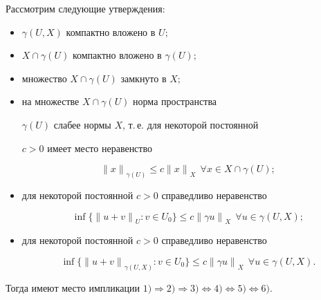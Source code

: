 \begin{thms} \label{DeniLions}


Рассмотрим следующие утверждения\/${:}$


\begin{itemize}


\item[1)] $\gamma(U,X)$ компактно вложено в $U;$


\item[2)] $X \cap \gamma(U)$ компактно вложено в $\gamma(U);$


\item[3)] множество $X \cap \gamma(U)$ замкнуто в $X;$


\item[4)] на множестве $X \cap \gamma(U)$ норма пространства


$\gamma(U)$ слабее нормы $X$, т.\,е. для некоторой постоянной


$c>0$ имеет место неравенство


$$


{\|x\|}_{\gamma(U)} \leq c {\|x\|}_X \ \ \forall x \in X


\cap \gamma(U);


$$


\item[5)] для некоторой постоянной $c >0$ справедливо неравенство


$$


\inf \{ {\|u+v\|}_U : v \in U_0 \} \leq c {\| \gamma u\|}_X


\ \ \forall u \in \gamma(U,X);


$$


\item[6)] для некоторой постоянной $c >0$ справедливо неравенство


$$


\inf \{ {\|u+v\|}_{\gamma(U,X)} : v \in U_0 \} \leq c {\|


\gamma u\|}_X \ \ \forall u \in \gamma(U,X).


$$


\end{itemize}


Тогда имеют место импликации $1) \Rightarrow 2) \Rightarrow 3)


\Leftrightarrow 4) \Leftrightarrow 5) \Leftrightarrow 6)$.


\end{thms}








